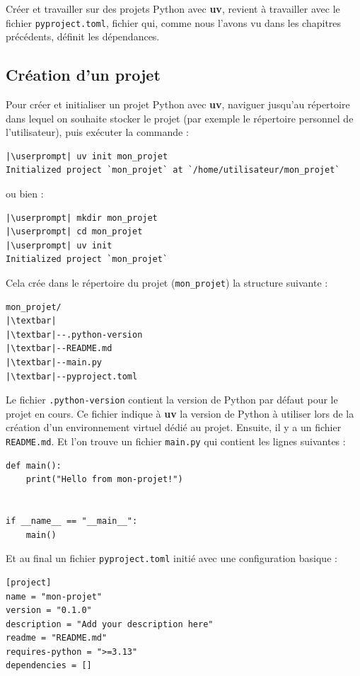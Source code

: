 Créer et travailler sur des projets Python avec \textbf{uv}, revient à travailler avec le fichier \texttt{pyproject.toml}, fichier qui, comme nous l'avons vu dans les chapitres précédents, définit les dépendances.

\subsection*{Création d'un projet}

Pour créer et initialiser un projet Python avec \textbf{uv}, naviguer jusqu'au répertoire dans lequel on souhaite stocker le projet (par exemple le répertoire personnel de l'utilisateur), puis exécuter la commande :
\begin{lstlisting}[style=bash]
|\userprompt| uv init mon_projet
Initialized project `mon_projet` at `/home/utilisateur/mon_projet`
\end{lstlisting}

ou bien :
\begin{lstlisting}[style=bash]
|\userprompt| mkdir mon_projet
|\userprompt| cd mon_projet
|\userprompt| uv init
Initialized project `mon_projet`
\end{lstlisting}

Cela crée dans le répertoire du projet (\texttt{mon\_projet}) la structure suivante :
\begin{lstlisting}[style=tree]
mon_projet/
|\textbar|
|\textbar|--.python-version
|\textbar|--README.md
|\textbar|--main.py
|\textbar|--pyproject.toml
\end{lstlisting}

Le fichier \texttt{.python-version} contient la version de Python par défaut pour le projet en cours. Ce fichier indique à \textbf{uv} la version de Python à utiliser lors de la création d'un environnement virtuel dédié au projet. Ensuite, il y a un fichier \texttt{README.md}.  Et l'on trouve un fichier \texttt{main.py} qui contient les lignes suivantes :
\begin{lstlisting}[style=python]
def main():
    print("Hello from mon-projet!")


if __name__ == "__main__":
    main()
\end{lstlisting}

Et au final un fichier \texttt{pyproject.toml} initié avec une configuration basique :
\begin{lstlisting}[style=file]
[project]
name = "mon-projet"
version = "0.1.0"
description = "Add your description here"
readme = "README.md"
requires-python = ">=3.13"
dependencies = []
\end{lstlisting}

